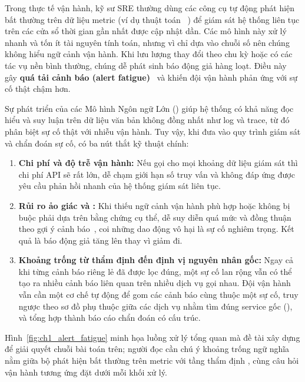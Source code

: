 Trong thực tế vận hành, kỹ sư SRE thường dùng các công cụ tự động phát hiện bất thường trên dữ liệu metric (ví dụ thuật toán ~\cite{isof}) để giám sát hệ thống liên tục trên các cửa sổ thời gian gần nhất được cập nhật dần. Các mô hình này xử lý nhanh và tốn ít tài nguyên tính toán, nhưng vì chỉ dựa vào chuỗi số nên chúng không hiểu ngữ cảnh vận hành. Khi lưu lượng thay đổi theo chu kỳ hoặc có các tác vụ nền bình thường, chúng dễ phát sinh báo động giả hàng loạt. Điều này gây \textbf{quá tải cảnh báo (alert fatigue)}~\cite{zhao2020alertstorm} và khiến đội vận hành phản ứng với sự cố thật chậm hơn.

Sự phát triển của các Mô hình Ngôn ngữ Lớn () giúp hệ thống có khả năng đọc hiểu và suy luận trên dữ liệu văn bản không đồng nhất như log và trace, từ đó phân biệt sự cố thật với nhiễu vận hành. Tuy vậy, khi đưa  vào quy trình giám sát và chẩn đoán sự cố, có ba nút thắt kỹ thuật chính:
\begin{enumerate}
    \item \textbf{Chi phí và độ trễ vận hành:} Nếu gọi  cho mọi khoảng dữ liệu giám sát thì chi phí API sẽ rất lớn, dễ chạm giới hạn số truy vấn và không đáp ứng được yêu cầu phản hồi nhanh của hệ thống giám sát liên tục.
    \item \textbf{Rủi ro ảo giác và :} Khi thiếu ngữ cảnh vận hành phù hợp hoặc không bị buộc phải dựa trên bằng chứng cụ thể,  dễ suy diễn quá mức và đồng thuận theo gợi ý cảnh báo~\cite{sharma2024sycophancy}, coi những dao động vô hại là sự cố nghiêm trọng. Kết quả là báo động giả tăng lên thay vì giảm đi.
    \item \textbf{Khoảng trống từ thẩm định đến định vị nguyên nhân gốc:} Ngay cả khi từng cảnh báo riêng lẻ đã được lọc đúng, một sự cố lan rộng vẫn có thể tạo ra nhiều cảnh báo liên quan trên nhiều dịch vụ gọi nhau. Đội vận hành vẫn cần một cơ chế tự động để gom các cảnh báo cùng thuộc một sự cố, truy ngược theo sơ đồ phụ thuộc giữa các dịch vụ nhằm tìm đúng service gốc (), và tổng hợp thành báo cáo chẩn đoán có cấu trúc.
\end{enumerate}

Hình~\ref{fig:ch1_alert_fatigue} minh họa luồng xử lý tổng quan mà đề tài xây dựng để giải quyết chuỗi bài toán trên; người đọc cần chú ý khoảng trống ngữ nghĩa nằm giữa bộ phát hiện bất thường trên metric với tầng thẩm định \CTAV{}, cùng câu hỏi vận hành tương ứng đặt dưới mỗi khối xử lý.

